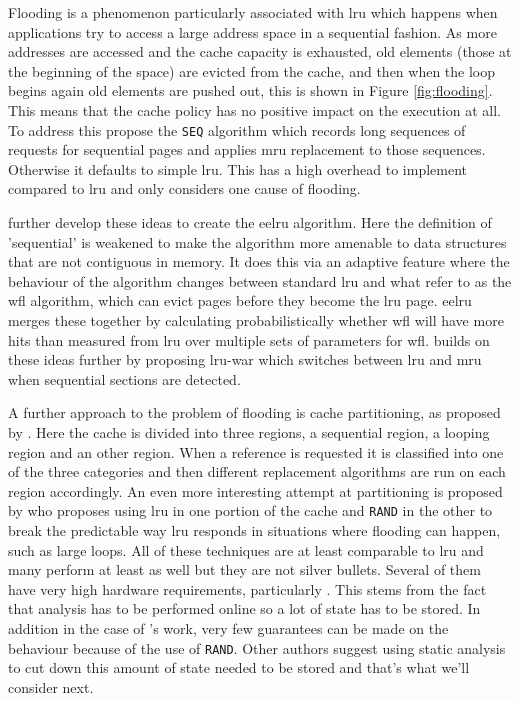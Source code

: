 Flooding is a phenomenon particularly associated with \gls{lru} which happens when applications try to access a large address space in a sequential fashion. As more addresses are accessed and the cache capacity is exhausted, old elements (those at the beginning of the space) are evicted from the cache, and then when the loop begins again old elements are pushed out, this is shown in Figure \ref{fig:flooding}. This means that the cache policy has no positive impact on the execution at all. To address this \citet{glassAdaptivePageReplacement1997} propose the \texttt{SEQ} algorithm which records long sequences of requests for sequential pages and applies \gls{mru} replacement to those sequences. Otherwise it defaults to simple \gls{lru}. This has a high overhead to implement compared to \gls{lru} and only considers one cause of flooding. 

\citet{smaragdakisEELRUSimpleEffective1999} further develop these ideas to create the \gls{eelru} algorithm. Here the definition of 'sequential' is weakened to make the algorithm more amenable to data structures that are not contiguous in memory. It does this via an adaptive feature where the behaviour of the algorithm changes between standard \gls{lru} and what \citeauthor{smaragdakisEELRUSimpleEffective1999} refer to as the \gls{wfl} algorithm, which can evict pages before they become the \gls{lru} page. \gls{eelru} merges these together by calculating probabilistically whether \gls{wfl} will have more hits than measured from \gls{lru} over multiple sets of parameters for \gls{wfl}. \citet{midorikawaAdaptiveReplacementBased2008} builds on these ideas further by proposing \gls{lru-war} which switches between \gls{lru} and \gls{mru} when sequential sections are detected.

A further approach to the problem of flooding is cache partitioning, as proposed by \citeauthor{kimLowoverheadHighperformanceUnified2000}. Here the cache is divided into three regions, a sequential region, a looping region and an other region. When a reference is requested it is classified into one of the three categories and then different replacement algorithms are run on each region accordingly. An even more interesting attempt at partitioning is proposed by \citet{dasRandomLRUReplacementPolicy2013a} who proposes using \gls{lru} in one portion of the cache and \texttt{RAND} in the other to break the predictable way \gls{lru} responds in situations where flooding can happen, such as large loops. All of these techniques are at least comparable to \gls{lru} and many perform at least as well but they are not silver bullets. Several of them have very high hardware requirements, particularly \citet{kimLowoverheadHighperformanceUnified2000}. This stems from the fact that analysis has to be performed online so a lot of state has to be stored. In addition in the case of \citeauthor{dasRandomLRUReplacementPolicy2013a}'s work, very few guarantees can be made on the behaviour because of the use of \texttt{RAND}. Other authors suggest using static analysis to cut down this amount of state needed to be stored and that's what we'll consider next.

